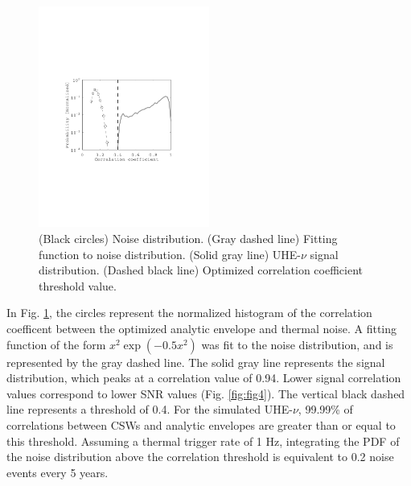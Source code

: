 \documentclass[amsmath,amssymb,aps,prd,10pt,twocolumn,showkeys]{revtex4}
\begin{document}
\begin{itemize}
\begin{figure}
\centering
\includegraphics[width=0.5\textwidth,trim=3.25cm 8.25cm 4.5cm 9.0cm,clip=true]{Aug15_plot1.pdf}
\caption{\label{fig:fig3} (Black circles) Noise distribution. (Gray dashed line) Fitting function to noise distribution.  (Solid gray line) UHE-$\nu$ signal distribution.  (Dashed black line) Optimized correlation coefficient threshold value.}
\end{figure}

In Fig. \ref{fig:fig3}, the circles represent the normalized histogram of the correlation coefficent between the optimized analytic envelope and thermal noise.  A fitting function of the form $x^2 \exp(-0.5 x^2)$ was fit to the noise distribution, and is represented by the gray dashed line.  The solid gray line represents the signal distribution, which peaks at a correlation value of 0.94.  Lower signal correlation values correspond to lower SNR values (Fig. \ref{fig:fig4}).  The vertical black dashed line represents a threshold of 0.4.  For the simulated UHE-$\nu$, 99.99\% of correlations between CSWs and analytic envelopes are greater than or equal to this threshold.  Assuming a thermal trigger rate of 1 Hz, integrating the PDF of the noise distribution above the correlation threshold is equivalent to 0.2 noise events every 5 years.


\end{itemize}
\end{document}
